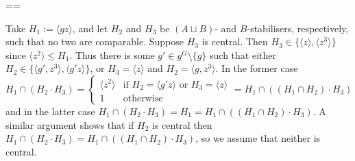 \documentclass[11pt, a4paper]{amsart}
\makeatletter
\renewcommand{\proofname}{Proof}
\renewenvironment{proof}[1][\proofname]{\par
  \pushQED{\qed}  \normalfont \partopsep=\z@skip \topsep=\z@skip
  \trivlist
  \item[\hskip\labelsep
        \scshape
    #1\@addpunct{.}]\ignorespaces
}{  \popQED\endtrivlist\@endpefalse
}
\makeatother
\begin{document}
\begin{proof}
    Take $H_1:=\langle gz\rangle$, and let $H_2$ and $H_3$ be $(A\sqcup B)$- and $B$-stabilisers, respectively, such that no two are comparable. Suppose $H_3$ is central. Then $H_3\in \{\langle z\rangle,\langle z^3\rangle\}$ since $\langle z^2\rangle\leq H_1$. Thus there is some $g'\in g^G\setminus\{g\}$ such that either $H_2\in \{\langle g',z^3\rangle,\langle g'z\rangle\}$, or $H_3=\langle z\rangle$ and $H_2=\langle g,z^3\rangle$. In the former case $$H_1\cap (H_2\cdot H_3)=\begin{cases}
        \langle z^2\rangle&\text{if $H_2=\langle g'z\rangle$ or $H_3=\langle z\rangle$}\\1&\text{otherwise}
    \end{cases}= H_1\cap((H_1\cap H_2)\cdot H_3)$$ and in the latter case $H_1\cap (H_2\cdot H_3)=H_1                        =H_1\cap((H_1\cap H_2)\cdot H_3).$ A similar argument shows that if $H_2$ is central then $H_1\cap(H_2\cdot H_3)=H_1\cap((H_1\cap H_2)\cdot H_3)$, so we assume that neither is central.
                        

\end{proof}
\end{document}
